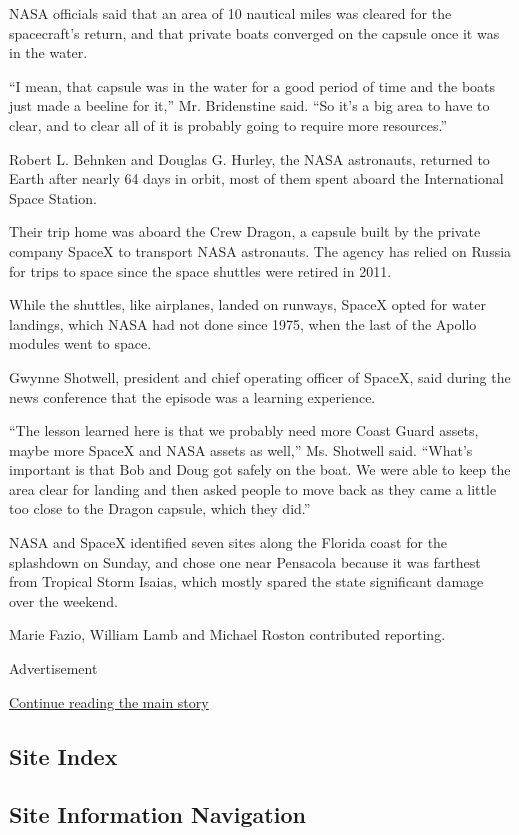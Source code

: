NASA officials said that an area of 10 nautical miles was cleared for
the spacecraft's return, and that private boats converged on the capsule
once it was in the water.

``I mean, that capsule was in the water for a good period of time and
the boats just made a beeline for it,'' Mr. Bridenstine said. ``So it's
a big area to have to clear, and to clear all of it is probably going to
require more resources.''

Robert L. Behnken and Douglas G. Hurley, the NASA astronauts, returned
to Earth after nearly 64 days in orbit, most of them spent aboard the
International Space Station.

Their trip home was aboard the Crew Dragon, a capsule built by the
private company SpaceX to transport NASA astronauts. The agency has
relied on Russia for trips to space since the space shuttles were
retired in 2011.

While the shuttles, like airplanes, landed on runways, SpaceX opted for
water landings, which NASA had not done since 1975, when the last of the
Apollo modules went to space.

Gwynne Shotwell, president and chief operating officer of SpaceX, said
during the news conference that the episode was a learning experience.

``The lesson learned here is that we probably need more Coast Guard
assets, maybe more SpaceX and NASA assets as well,'' Ms. Shotwell said.
``What's important is that Bob and Doug got safely on the boat. We were
able to keep the area clear for landing and then asked people to move
back as they came a little too close to the Dragon capsule, which they
did.''

NASA and SpaceX identified seven sites along the Florida coast for the
splashdown on Sunday, and chose one near Pensacola because it was
farthest from Tropical Storm Isaias, which mostly spared the state
significant damage over the weekend.

Marie Fazio, William Lamb and Michael Roston contributed reporting.

Advertisement

\protect\hyperlink{after-bottom}{Continue reading the main story}

\hypertarget{site-index}{%
\subsection{Site Index}\label{site-index}}

\hypertarget{site-information-navigation}{%
\subsection{Site Information
Navigation}\label{site-information-navigation}}

